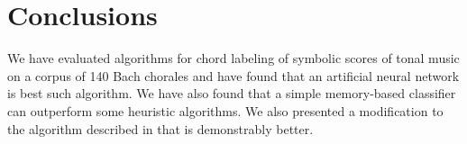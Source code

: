 \documentclass{article}
\begin{document}
\section{Conclusions}
\label{sec:conclusions}

We have evaluated algorithms for chord labeling of symbolic scores of
tonal music on a corpus of 140 Bach chorales and have found that an
artificial neural network is best such algorithm. We have also found
that a simple memory-based classifier can outperform some heuristic
algorithms. We also presented a modification to the algorithm
described in \cite{pardo.ea:algorithms} that is demonstrably better.



\end{document}
